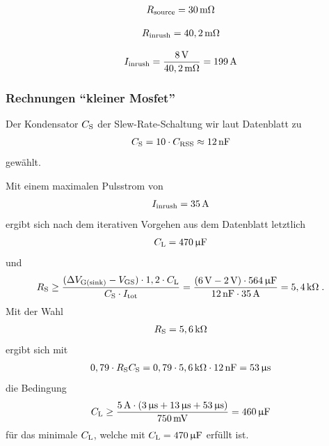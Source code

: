 \begin{align*}
	R_{\mathrm{source}} = 30\,\mathrm{m\Omega}
\end{align*}

\begin{align*}
	R_{\mathrm{inrush}} = 40,2\,\mathrm{m\Omega}
\end{align*}

\begin{align*}
	I_{\mathrm{inrush}} = \frac{8\,\mathrm{V}}{40,2\,\mathrm{m \Omega}} = 199\,\mathrm{A}
\end{align*}




\subsubsection{Rechnungen "`kleiner Mosfet"'}

Der Kondensator $C_{\mathrm{S}}$ der Slew-Rate-Schaltung wir laut Datenblatt zu
\begin{align*}
	C_{\mathrm{S}} = 10 \cdot C_{\mathrm{RSS}} \approx 12\,\mathrm{nF} 
\end{align*}
gewählt.

Mit einem maximalen Pulsstrom von
\begin{align*}
	I_{\mathrm{inrush}} = 35\,\mathrm{A}
\end{align*}
ergibt sich nach dem iterativen Vorgehen aus dem Datenblatt letztlich
\begin{align*}
	C_{\mathrm{L}} = 470\,\mathrm{\upmu F}
\end{align*}
und
\begin{align*}
	R_{\mathrm{S}} \geq 
		\frac{(\Delta V_{\mathrm{G(sink)}} - V_{\mathrm{GS}}) \cdot 1,2 \cdot C_{\mathrm{L}}}{C_{\mathrm{S}} \cdot I_{\mathrm{tot}}}
		= \frac{(6\,\mathrm{V} - 2\,\mathrm{V}) \cdot 564\,\mathrm{\upmu F}}{12\,\mathrm{nF} \cdot 35\,\mathrm{A}}
		= 5,4\,\mathrm{k\Omega}\;.
\end{align*}
Mit der Wahl
\begin{align*}
	R_{\mathrm{S}} = 5,6\,\mathrm{k\Omega}
\end{align*}
ergibt sich mit
\begin{align*}
	 0,79 \cdot R_{\mathrm{S}} C_{\mathrm{S}} = 0,79 \cdot 5,6\,\mathrm{k\Omega} \cdot 12\,\mathrm{nF} = 53\,\mathrm{\upmu s}
\end{align*}
die Bedingung
\begin{align*}
	C_{\mathrm{L}} \geq \frac{5\,\mathrm{A} \cdot (3\,\mathrm{\upmu s} + 13\,\mathrm{\upmu s} + 53\,\mathrm{\upmu s})}{750\,\mathrm{mV}} = 460\,\mathrm{\upmu F}
\end{align*}
für das minimale $C_{\mathrm{L}}$, welche mit $C_{\mathrm{L}} = 470\,\mathrm{\upmu F}$ erfüllt ist.




